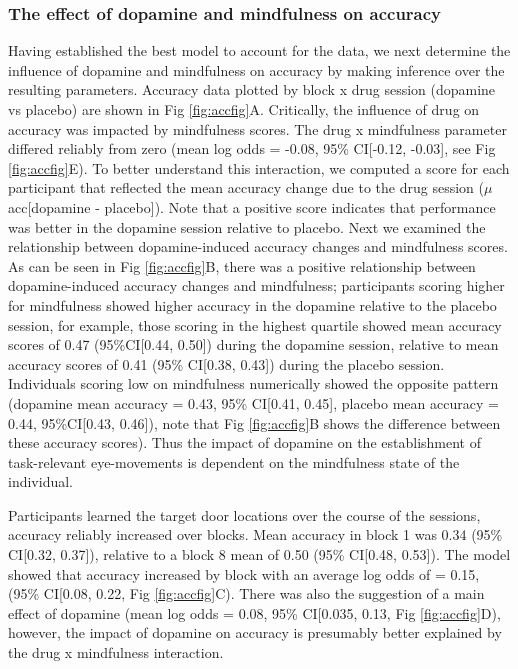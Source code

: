 \documentclass{article}
\begin{document}
\hypertarget{the-effect-of-dopamine-and-mindfulness-on-accuracy}{%
\subsubsection{The effect of dopamine and mindfulness on
accuracy}\label{the-effect-of-dopamine-and-mindfulness-on-accuracy}}

Having established the best model to account for the data, we next
determine the influence of dopamine and mindfulness on accuracy by
making inference over the resulting parameters. Accuracy data plotted by
block x drug session (dopamine vs placebo) are shown in Fig
\ref{fig:accfig}A. Critically, the influence of drug on accuracy was
impacted by mindfulness scores. The drug x mindfulness parameter
differed reliably from zero (mean log odds = -0.08, 95\% CI{[}-0.12,
-0.03{]}, see Fig \ref{fig:accfig}E). To better understand this
interaction, we computed a score for each participant that reflected the
mean accuracy change due to the drug session (\(\mu\) acc{[}dopamine -
placebo{]}). Note that a positive score indicates that performance was
better in the dopamine session relative to placebo. Next we examined the
relationship between dopamine-induced accuracy changes and mindfulness
scores. As can be seen in Fig \ref{fig:accfig}B, there was a positive
relationship between dopamine-induced accuracy changes and mindfulness;
participants scoring higher for mindfulness showed higher accuracy in
the dopamine relative to the placebo session, for example, those scoring
in the highest quartile showed mean accuracy scores of 0.47
(95\%CI{[}0.44, 0.50{]}) during the dopamine session, relative to mean
accuracy scores of 0.41 (95\% CI{[}0.38, 0.43{]}) during the placebo
session. Individuals scoring low on mindfulness numerically showed the
opposite pattern (dopamine mean accuracy = 0.43, 95\% CI{[}0.41,
0.45{]}, placebo mean accuracy = 0.44, 95\%CI{[}0.43, 0.46{]}), note
that Fig \ref{fig:accfig}B shows the difference between these accuracy
scores). Thus the impact of dopamine on the establishment of
task-relevant eye-movements is dependent on the mindfulness state of the
individual.

Participants learned the target door locations over the course of the
sessions, accuracy reliably increased over blocks. Mean accuracy in
block 1 was 0.34 (95\% CI{[}0.32, 0.37{]}), relative to a block 8 mean
of 0.50 (95\% CI{[}0.48, 0.53{]}). The model showed that accuracy
increased by block with an average log odds of = 0.15, (95\% CI{[}0.08,
0.22, Fig \ref{fig:accfig}C). There was also the suggestion of a main
effect of dopamine (mean log odds = 0.08, 95\% CI{[}0.035, 0.13, Fig
\ref{fig:accfig}D), however, the impact of dopamine on accuracy is
presumably better explained by the drug x mindfulness interaction.
\end{document}

